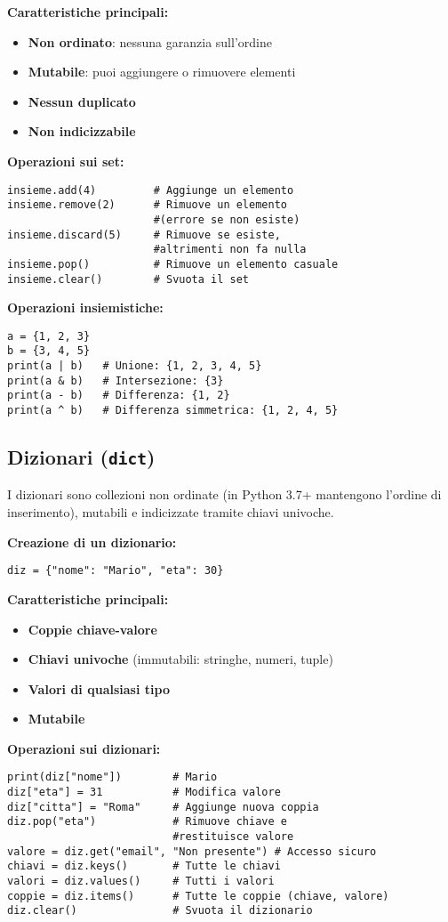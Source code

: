 \documentclass[a4paper,12pt]{article}
\begin{document}
\textbf{Caratteristiche principali:}
\begin{itemize}
    \item \textbf{Non ordinato}: nessuna garanzia sull'ordine
    \item \textbf{Mutabile}: puoi aggiungere o rimuovere elementi
    \item \textbf{Nessun duplicato}
    \item \textbf{Non indicizzabile}
\end{itemize}

\textbf{Operazioni sui set:}
\begin{lstlisting}
insieme.add(4)         # Aggiunge un elemento
insieme.remove(2)      # Rimuove un elemento
                       #(errore se non esiste)
insieme.discard(5)     # Rimuove se esiste,
                       #altrimenti non fa nulla
insieme.pop()          # Rimuove un elemento casuale
insieme.clear()        # Svuota il set
\end{lstlisting}

\textbf{Operazioni insiemistiche:}
\begin{lstlisting}
a = {1, 2, 3}
b = {3, 4, 5}
print(a | b)   # Unione: {1, 2, 3, 4, 5}
print(a & b)   # Intersezione: {3}
print(a - b)   # Differenza: {1, 2}
print(a ^ b)   # Differenza simmetrica: {1, 2, 4, 5}
\end{lstlisting}

\subsection*{Dizionari (\texttt{dict})}
I dizionari sono collezioni non ordinate (in Python 3.7+ mantengono l'ordine di inserimento), mutabili e indicizzate tramite chiavi univoche.

\textbf{Creazione di un dizionario:}
\begin{lstlisting}
diz = {"nome": "Mario", "eta": 30}
\end{lstlisting}

\textbf{Caratteristiche principali:}
\begin{itemize}
    \item \textbf{Coppie chiave-valore}
    \item \textbf{Chiavi univoche} (immutabili: stringhe, numeri, tuple)
    \item \textbf{Valori di qualsiasi tipo}
    \item \textbf{Mutabile}
\end{itemize}

\textbf{Operazioni sui dizionari:}
\begin{lstlisting}
print(diz["nome"])        # Mario
diz["eta"] = 31           # Modifica valore
diz["citta"] = "Roma"     # Aggiunge nuova coppia
diz.pop("eta")            # Rimuove chiave e
                          #restituisce valore
valore = diz.get("email", "Non presente") # Accesso sicuro
chiavi = diz.keys()       # Tutte le chiavi
valori = diz.values()     # Tutti i valori
coppie = diz.items()      # Tutte le coppie (chiave, valore)
diz.clear()               # Svuota il dizionario
\end{lstlisting}
\end{document}
